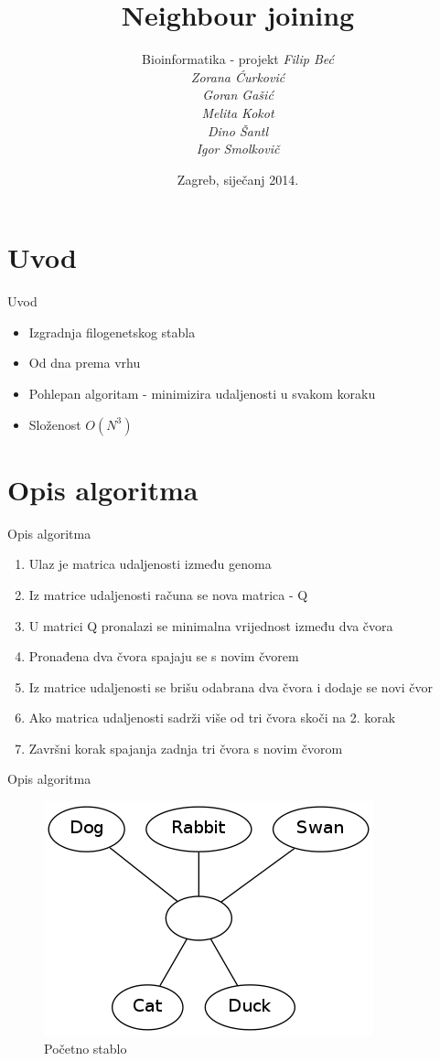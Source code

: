 \documentclass[utf8]{beamer}
\title[Neighbour joining]{Neighbour joining}
\author[Dino Šantl]{Bioinformatika - projekt \newline\newline 
				 \itshape		{Filip Beć}\\
				 \itshape{Zorana Ćurković}\\
				 \itshape{Goran Gašić}\\
				 \itshape{Melita Kokot}\\
				 \itshape{Dino Šantl}\\
				 \itshape{Igor Smolkovič}
}
\institute{Fakultet elektrotehnike i računarstva}
\date{Zagreb, siječanj 2014.}
\begin{document}
\begin{frame}
\titlepage
\end{frame}

\section{Uvod}
\begin{frame}{Uvod}
\begin{itemize}
	\item Izgradnja filogenetskog stabla
	\item Od dna prema vrhu
	\item Pohlepan algoritam - minimizira udaljenosti u svakom koraku
	\item Složenost $O(N^3)$
\end{itemize}
\end{frame}

\section{Opis algoritma}
\begin{frame}{Opis algoritma}
\begin{enumerate}
	\item Ulaz je matrica udaljenosti između genoma 
	\pause
	\item Iz matrice udaljenosti računa se nova matrica - Q
	\pause
	\item U matrici Q pronalazi se minimalna vrijednost između dva čvora
	\pause
	\item Pronađena dva čvora spajaju se s novim čvorem
	\pause
	\item Iz matrice udaljenosti se brišu odabrana dva čvora i dodaje se novi čvor
	\pause
	\item Ako matrica udaljenosti sadrži više od tri čvora skoči na 2. korak
	\pause
	\item Završni korak spajanja zadnja tri čvora s novim čvorom
\end{enumerate}
\end{frame}

\begin{frame}{Opis algoritma}
\begin{figure}[htb]
\centering
\includegraphics[scale=0.5]{../Dokumentacija/img/pocetni.png}
\caption{Početno stablo}
\end{figure}
\end{frame}
\end{document}
